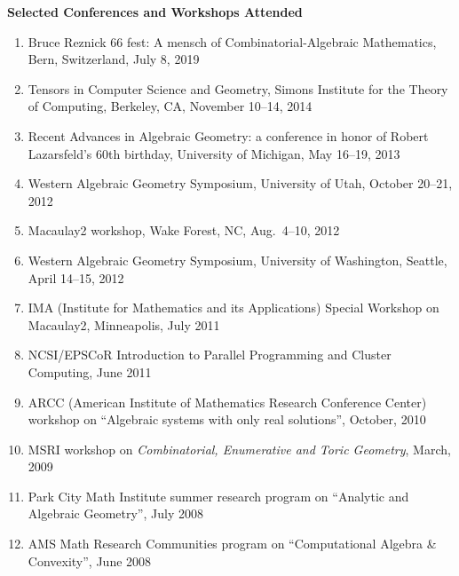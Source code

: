 \documentclass[12pt]{article}
\begin{document}
\textbf{Selected Conferences and Workshops Attended}
\begin{enumerate}
\item Bruce Reznick 66 fest: A mensch of Combinatorial-Algebraic Mathematics, Bern, Switzerland, July 8, 2019
\item Tensors in Computer Science and Geometry, Simons Institute for the Theory of Computing, Berkeley, CA, November 10--14, 2014
\item Recent Advances in Algebraic Geometry: a conference in honor of Robert Lazarsfeld's 60th birthday,
University of Michigan, May 16--19, 2013
\item Western Algebraic Geometry Symposium, University of Utah, October 20--21, 2012
\item Macaulay2 workshop, Wake Forest, NC, Aug.~4--10, 2012
\item Western Algebraic Geometry Symposium, University of Washington, Seattle, April 14--15, 2012
\item IMA (Institute for Mathematics and its Applications) Special Workshop on Macaulay2, Minneapolis, July 2011
\item NCSI/EPSCoR Introduction to Parallel Programming and Cluster Computing, June 2011
\item ARCC (American Institute of Mathematics Research Conference Center) workshop on
``Algebraic systems with only real solutions'', October, 2010
\item MSRI workshop on \textit{Combinatorial, Enumerative and Toric Geometry}, March, 2009
\item Park City Math Institute summer research program on ``Analytic and Algebraic Geometry'', July 2008
\item AMS Math Research Communities program on ``Computational Algebra \& Convexity'', June 2008
\end{enumerate}

\end{document}
